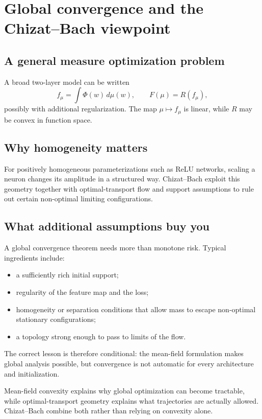 \documentclass[11pt,a4paper,oneside,openany]{memoir}
\theoremstyle{definition}
\begin{document}
\chapter{Global convergence and the Chizat--Bach viewpoint}
\section{A general measure optimization problem}
A broad two-layer model can be written
\[
f_\mu=\int \Phi(w)\,d\mu(w),
\qquad
F(\mu)=R(f_\mu),
\]
possibly with additional regularization.  The map $\mu\mapsto f_\mu$ is linear, while $R$ may be convex in function space.

\section{Why homogeneity matters}
For positively homogeneous parameterizations such as ReLU networks, scaling a neuron changes its amplitude in a structured way.  Chizat--Bach exploit this geometry together with optimal-transport flow and support assumptions to rule out certain non-optimal limiting configurations.

\section{What additional assumptions buy you}
A global convergence theorem needs more than monotone risk.  Typical ingredients include:
\begin{itemize}
\item a sufficiently rich initial support;
\item regularity of the feature map and the loss;
\item homogeneity or separation conditions that allow mass to escape non-optimal stationary configurations;
\item a topology strong enough to pass to limits of the flow.
\end{itemize}
The correct lesson is therefore conditional: the mean-field formulation makes global analysis possible, but convergence is not automatic for every architecture and initialization.

\begin{presentbox}
Mean-field convexity explains why global optimization can become tractable, while optimal-transport geometry explains what trajectories are actually allowed.  Chizat--Bach combine both rather than relying on convexity alone.
\end{presentbox}
\end{document}
